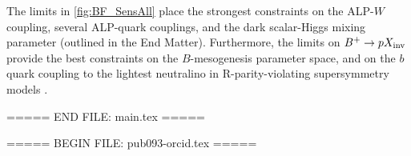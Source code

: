 The limits in \cref{fig:BF_SensAll} place the strongest constraints on the ALP-$W$ coupling, several ALP-quark couplings, and the dark scalar-Higgs mixing parameter (outlined in the End Matter). Furthermore, the limits on $B^+\rightarrow pX_{\rm{inv}}$ provide the best constraints on the $B$-mesogenesis \cite{Elor_2019, Alonso_lvarez_2021} parameter space, and on the $b$ quark coupling to the lightest neutralino in R-parity-violating supersymmetry models \cite{Dib_2023}.







\clearpage
\onecolumngrid

\clearpage



===== END FILE: main.tex =====

===== BEGIN FILE: pub093-orcid.tex =====





  \author{M.~Abumusabh\,}
  \author{I.~Adachi\,}

  \author{L.~Aggarwal\,}

  \author{H.~Ahmed\,}

  \author{Y.~Ahn\,}
  \author{H.~Aihara\,}
  \author{N.~Akopov\,}
  \author{S.~Alghamdi\,}
  \author{M.~Alhakami\,}
  \author{A.~Aloisio\,}


  \author{N.~Althubiti\,}
  \author{K.~Amos\,}


  \author{N.~Anh~Ky\,}
  \author{C.~Antonioli\,}
  \author{D.~M.~Asner\,}
  \author{H.~Atmacan\,}

  \author{T.~Aushev\,}


  \author{R.~Ayad\,}

  \author{V.~Babu\,}

  \author{H.~Bae\,}
  \author{N.~K.~Baghel\,}
  \author{S.~Bahinipati\,}

